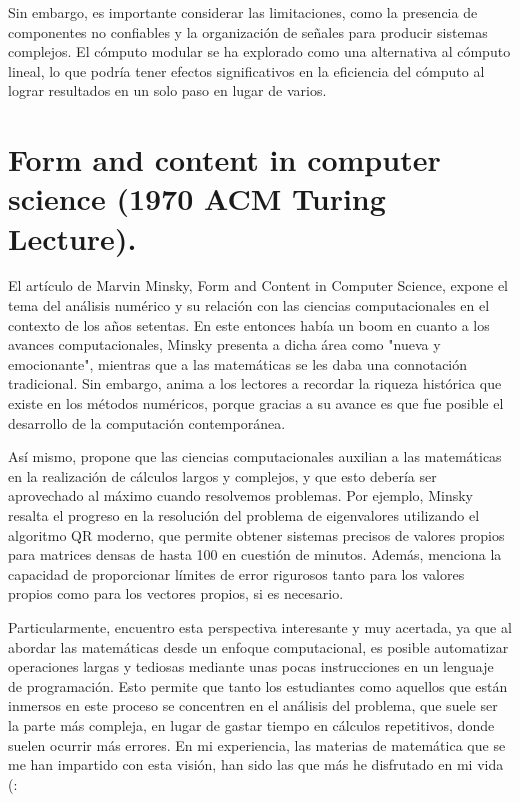 \documentclass[12pt]{article} %
\begin{document}
	Sin embargo, es importante considerar las limitaciones, como la presencia de componentes no confiables y la organización de señales para producir sistemas complejos. El cómputo modular se ha explorado como una alternativa al cómputo lineal, lo que podría tener efectos significativos en la eficiencia del cómputo al lograr resultados en un solo paso en lugar de varios.
	
	
	\section{Form and content in computer science (1970 ACM Turing Lecture).}
	
	
	El artículo de Marvin Minsky, Form and Content in Computer Science, expone el tema del análisis numérico y su relación con las ciencias computacionales en el contexto de los años setentas. En este entonces había un boom en cuanto a los avances computacionales, Minsky presenta a dicha área como "nueva y emocionante", mientras que a las matemáticas se les daba una connotación tradicional. Sin embargo, anima a los lectores a recordar la riqueza histórica que existe en los métodos numéricos, porque gracias a su avance es que fue posible el desarrollo de la computación contemporánea.
	
	Así mismo, propone que las ciencias computacionales auxilian a las matemáticas en la realización de cálculos largos y complejos, y que esto debería ser aprovechado al máximo cuando resolvemos problemas. Por ejemplo, Minsky resalta el progreso en la resolución del problema de eigenvalores utilizando el algoritmo QR moderno, que permite obtener sistemas precisos de valores propios para matrices densas de hasta 100 en cuestión de minutos. Además, menciona la capacidad de proporcionar límites de error rigurosos tanto para los valores propios como para los vectores propios, si es necesario. 
	
	Particularmente, encuentro esta perspectiva interesante y muy acertada, ya que al abordar las matemáticas desde un enfoque computacional, es posible automatizar operaciones largas y tediosas mediante unas pocas instrucciones en un lenguaje de programación. Esto permite que tanto los estudiantes como aquellos que están inmersos en este proceso se concentren en el análisis del problema, que suele ser la parte más compleja, en lugar de gastar tiempo en cálculos repetitivos, donde suelen ocurrir más errores. En mi experiencia, las materias de matemática que se me han impartido con esta visión, han sido las que más he disfrutado en mi vida (:
	
\end{document}
